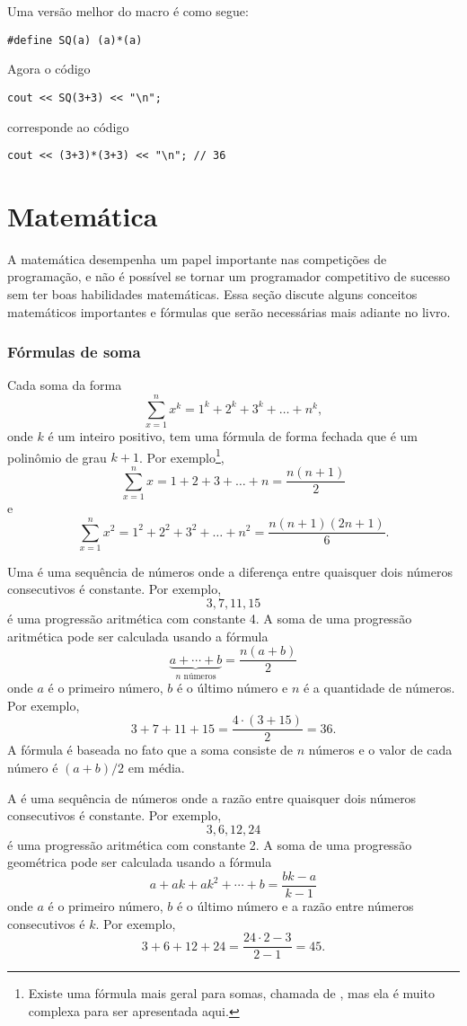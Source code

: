 Uma versão melhor do macro é como segue:
\begin{lstlisting}
#define SQ(a) (a)*(a)
\end{lstlisting}
Agora o código
\begin{lstlisting}
cout << SQ(3+3) << "\n";
\end{lstlisting}
corresponde ao código
\begin{lstlisting}
cout << (3+3)*(3+3) << "\n"; // 36
\end{lstlisting}


\section{Matemática}

A matemática desempenha um papel importante nas competições de programação,
e não é possível se tornar um programador competitivo de sucesso sem
ter boas habilidades matemáticas.
Essa seção discute alguns conceitos matemáticos importantes e fórmulas que
serão necessárias mais adiante no livro.

\subsubsection{Fórmulas de soma}

Cada soma da forma
\[\sum_{x=1}^n x^k = 1^k+2^k+3^k+\ldots+n^k,\]
onde $k$ é um inteiro positivo,
tem uma fórmula de forma fechada que é um polinômio de grau $k+1$.
Por exemplo\footnote{
Existe uma fórmula mais geral para somas, chamada de ,
mas ela é muito complexa para ser apresentada aqui.},
\[\sum_{x=1}^n x = 1+2+3+\ldots+n = \frac{n(n+1)}{2}\]
e
\[\sum_{x=1}^n x^2 = 1^2+2^2+3^2+\ldots+n^2 = \frac{n(n+1)(2n+1)}{6}.\]

Uma  é uma 
sequência de números onde a diferença entre quaisquer dois números consecutivos
é constante.
Por exemplo,
\[3, 7, 11, 15\]
é uma progressão aritmética com constante 4.
A soma de uma progressão aritmética pode ser calculada
usando a fórmula
\[\underbrace{a + \cdots + b}_{n \,\, \textrm{números}} = \frac{n(a+b)}{2}\]
onde $a$ é o primeiro número,
$b$ é o último número e
$n$ é a quantidade de números.
Por exemplo,
\[3+7+11+15=\frac{4 \cdot (3+15)}{2} = 36.\]
A fórmula é baseada no fato que a soma consiste de $n$ números e o valor de cada
número é $(a+b)/2$ em média.

A  é uma sequência de números onde a razão entre
quaisquer dois números consecutivos é constante.
Por exemplo,
\[3,6,12,24\]
é uma progressão aritmética com constante 2.
A soma de uma progressão geométrica pode ser calculada usando a fórmula
\[a + ak + ak^2 + \cdots + b = \frac{bk-a}{k-1}\]
onde $a$ é o primeiro número,
$b$ é o último número e a razão entre números consecutivos é $k$.
Por exemplo,
\[3+6+12+24=\frac{24 \cdot 2 - 3}{2-1} = 45.\]

